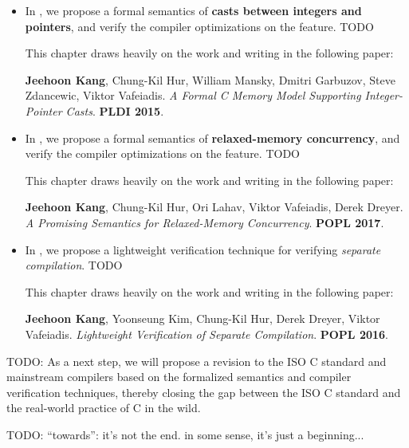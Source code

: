 %
\begin{itemize}
\item In , we propose a formal semantics of \textbf{casts between integers and
    pointers}, and verify the compiler optimizations on the feature.  TODO

  This chapter draws heavily on the work and writing in the following paper:

  {\small \cite{intptrcast} \textbf{Jeehoon Kang}, Chung-Kil Hur, William Mansky, Dmitri Garbuzov,
    Steve Zdancewic, Viktor Vafeiadis.  \emph{A Formal C Memory Model Supporting Integer-Pointer
      Casts}.  \textbf{PLDI 2015}.}

\item In , we propose a formal semantics of \textbf{relaxed-memory
    concurrency}, and verify the compiler optimizations on the feature.  TODO

  This chapter draws heavily on the work and writing in the following paper:

  {\small \cite{promising} \textbf{Jeehoon Kang}, Chung-Kil Hur, Ori Lahav, Viktor Vafeiadis, Derek
    Dreyer.  \emph{A Promising Semantics for Relaxed-Memory Concurrency}.  \textbf{POPL 2017}.}

\item In , we propose a lightweight verification technique for verifying
  \emph{separate compilation}.  TODO

  This chapter draws heavily on the work and writing in the following paper:

  {\small \cite{sepcomp} \textbf{Jeehoon Kang}, Yoonseung Kim, Chung-Kil Hur, Derek Dreyer, Viktor
    Vafeiadis.  \emph{Lightweight Verification of Separate Compilation}.  \textbf{POPL 2016}.}
\end{itemize}

TODO: As a next step, we will propose a revision to the ISO C standard and mainstream compilers
based on the formalized semantics and compiler verification techniques, thereby closing the gap
between the ISO C standard and the real-world practice of C in the wild.

TODO: ``towards'': it's not the end.  in some sense, it's just a beginning...



\paragraph*{}

